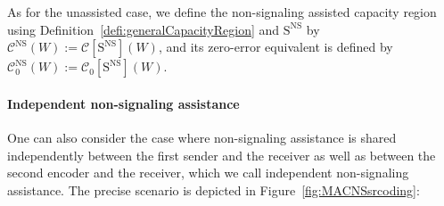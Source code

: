 
As for the unassisted case, we define the non-signaling assisted capacity region using Definition~\ref{defi:generalCapacityRegion} and $\mathrm{S}^{\mathrm{NS}}$ by $\mathcal{C}^{\mathrm{NS}}(W) := \mathcal{C}[\mathrm{S}^{\mathrm{NS}}](W)$, and its zero-error equivalent is defined by $\mathcal{C}^{\mathrm{NS}}_0(W) := \mathcal{C}_0[\mathrm{S}^{\mathrm{NS}}](W)$.

\paragraph{Independent non-signaling assistance} One can also consider the case where non-signaling assistance is shared independently between the first sender and the receiver as well as between the second encoder and the receiver, which we call independent non-signaling assistance. The precise scenario is depicted in Figure~\ref{fig:MACNSsrcoding}:

